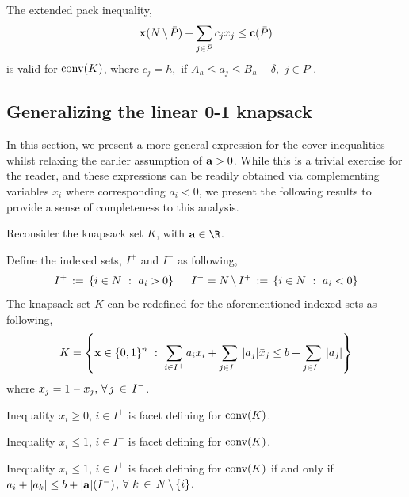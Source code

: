 \documentclass[10pt,twoside]{amsart}
\begin{document}
\begin{cor}
  The extended pack inequality,
  \begin{align}
    \mathbf{x}(N\,\backslash\, \bar{P}) + \sum_{j \in \bar{P}}c_j x_j \leq \mathbf{c}(\bar{P})
  \end{align}
  is valid for $\operatorname{conv}(K)$, where $c_j = h,$ if $\bar{A}_h \leq a_j \leq \bar{B}_h - \bar{\delta},\,\,j\in \bar{P}$ .
\end{cor}
\subsection{Generalizing the linear 0-1 knapsack}

In this section, we present a more general expression for the cover inequalities whilst relaxing the earlier assumption of $\mathbf{a} > 0$. While this is a trivial exercise for the reader, and these expressions can be readily obtained via complementing variables $x_i$ where corresponding $a_i < 0$, we present the following results to provide a sense of completeness to this analysis.

Reconsider the knapsack set $K$, with $\a\in \R$.

Define the indexed sets, $I^+$ and $I^-$ as following,
\begin{align*}
      I^+ \,:=\, \left\{ {i \in N} \ : \ {a_i > 0} \right\}\hspace{0.5cm} I^- = N\,\backslash\, I^+ \,:=\, \left\{ {i \in N} \ : \ {a_i < 0} \right\}
\end{align*}
The knapsack set $K$ can be redefined for the aforementioned indexed sets as following,
\begin{align}
    K = \left\{ {\mathbf{x} \in \{0,1\}^n} \ : \ {\sum_{i\in I^+} a_ix_i + \sum_{j\in I^-} |a_j|\bar{x}_j \leq b + \sum_{j\in I^-} |a_j|} \right\}\label{set:genknapsack}
\end{align}
where $\bar{x}_j = 1-x_j,\,\forall\,j\,\in\, I^-$.

\begin{prop}
  Inequality $x_i \geq 0$, $i\in I^+$ is facet defining for $\operatorname{conv}(K)$.
\end{prop}

\begin{prop}
  Inequality $x_i \leq 1$, $i\in I^-$ is facet defining for $\operatorname{conv}(K)$.
\end{prop}

\begin{prop}
  Inequality $x_i \leq 1$, $i\in I^+$ is facet defining for $\operatorname{conv}(K)$ if and only if $a_i + |a_k| \leq b + |\mathbf{a}|(I^-) $, $\forall\,\,k\,\in\, N\,\backslash\,\{i\}$.
\end{prop}
\end{document}
